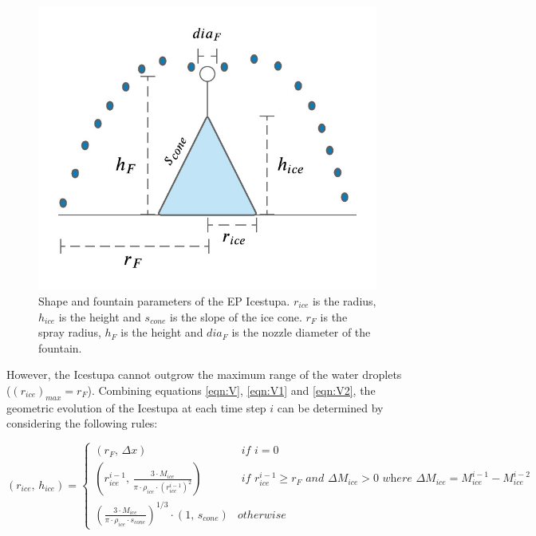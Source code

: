 \documentclass[utf8]{frontiersSCNS} %
\begin{document}
  \begin{figure} \begin{center} \includegraphics[width=10 cm]{Figures/Figure_5.jpg} \end{center} \caption{Shape and
fountain parameters of the EP Icestupa. $r_{ice}$ is the radius, $h_{ice}$ is the height and $s_{cone}$ is the
slope of the ice cone. $r_F$ is the spray radius, $h_F$ is the height and $dia_F$ is the nozzle diameter of the
fountain.} \label{fig:shape} \end{figure}
  
However, the Icestupa cannot outgrow the maximum range of the water droplets ($(r_{ice})_{max} = r_{F}$). Combining
equations \ref{eqn:V}, \ref{eqn:V1} and \ref{eqn:V2}, the geometric evolution of the Icestupa at each time step $i$
can be determined by considering the following rules:

\begin{equation} (r_{ice},\, h_{ice}) = \left\{ \begin{array}{ll} (r_F ,\, \Delta x) & \textit{ if } i=0\\
    (r_{ice}^{i-1},\, \frac{3 \cdot M_{ice}}{\pi \cdot \rho_{ice} \cdot {(r_{ice}^{i-1})}^2}) & \textit{ if }
    r_{ice}^{i-1} \geq r_{F} \textit{ and } \Delta M_{ice} > 0 \textit{ where } \Delta M_{ice} = M_{ice}^{i-1} -
    M_{ice}^{i-2}\\ (\frac{3 \cdot M_{ice}}{\pi \cdot \rho_{ice} \cdot s_{cone}})^{1/3} \cdot (1,\,  s_{cone}) &
otherwise \end{array} \right.  \label{eqn:A2} \end{equation}
\end{document}
